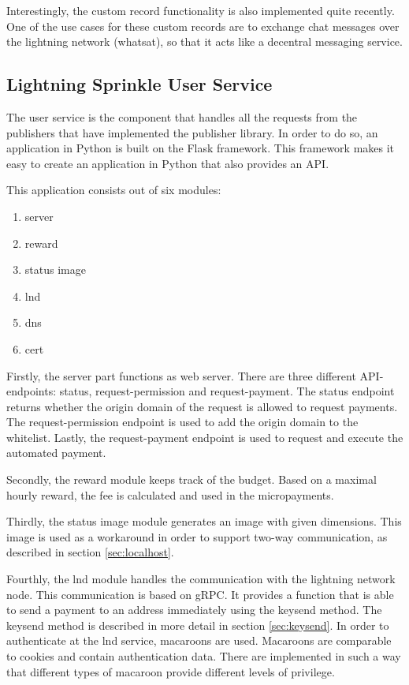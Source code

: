 Interestingly, the custom record functionality is also implemented quite recently. One of the use cases for these custom records are to exchange chat messages over the lightning network (whatsat), so that it acts like a decentral messaging service. 


\subsection{Lightning Sprinkle User Service}

The user service is the component that handles all the requests from the publishers that have implemented the publisher library. In order to do so, an application in Python is built on the Flask framework. This framework makes it easy to create an application in Python that also provides an API.

This application consists out of six modules:
\begin{enumerate}
  \item server
  \item reward
  \item status image
  \item lnd
  \item dns
  \item cert 
\end{enumerate}

Firstly, the server part functions as web server. There are three different API-endpoints: status, request-permission and request-payment. The status endpoint returns whether the origin domain of the request is allowed to request payments. The request-permission endpoint is used to add the origin domain to the whitelist. Lastly, the request-payment endpoint is used to request and execute the automated payment.

Secondly, the reward module keeps track of the budget. Based on a maximal hourly reward, the fee is calculated and used in the micropayments.

Thirdly, the status image module generates an image with given dimensions. This image is used as a workaround in order to support two-way communication, as described in section \ref{sec:localhost}.

Fourthly, the lnd module handles the communication with the lightning network node. This communication is based on gRPC. It provides a function that is able to send a payment to an address immediately using the keysend method. The keysend method is described in more detail in section \ref{sec:keysend}. In order to authenticate at the lnd service, macaroons are used. Macaroons are comparable to cookies and contain authentication data. There are implemented in such a way that different types of macaroon provide different levels of privilege. 

